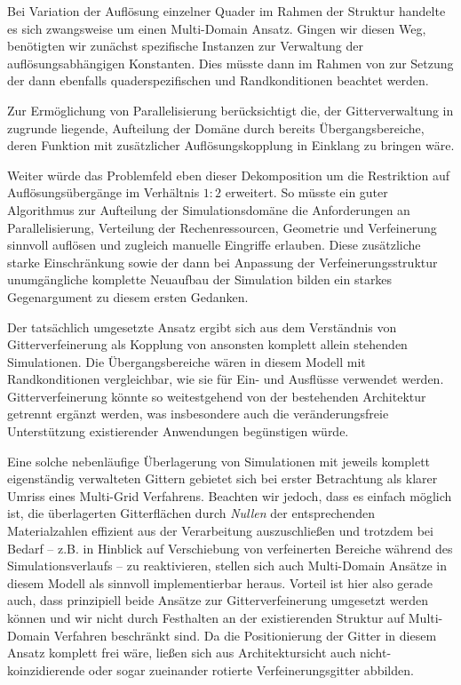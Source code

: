 Bei Variation der Auflösung einzelner Quader im Rahmen der  Struktur handelte es sich zwangsweise um einen Multi-Domain Ansatz. Gingen wir diesen Weg, benötigten wir zunächst  spezifische  Instanzen zur Verwaltung der auflösungsabhängigen Konstanten. Dies müsste dann im Rahmen von  zur Setzung der dann ebenfalls quaderspezifischen  und Randkonditionen beachtet werden.

Zur Ermöglichung von Parallelisierung berücksichtigt die, der Gitterverwaltung in  zugrunde liegende, Aufteilung der Domäne durch  bereits Übergangsbereiche, deren Funktion mit zusätzlicher Auflösungskopplung in Einklang zu bringen wäre.

Weiter würde das Problemfeld eben dieser Dekomposition um die Restriktion auf Auflösungsübergänge im Verhältnis \(1:2\) erweitert. So müsste ein guter Algorithmus zur Aufteilung der Simulationsdomäne die Anforderungen an Parallelisierung, Verteilung der Rechenressourcen, Geometrie und Verfeinerung sinnvoll auflösen und zugleich manuelle Eingriffe erlauben. Diese zusätzliche starke Einschränkung sowie der dann bei Anpassung der Verfeinerungsstruktur unumgängliche komplette Neuaufbau der Simulation bilden ein starkes Gegenargument zu diesem ersten Gedanken.

\bigskip
Der tatsächlich umgesetzte Ansatz ergibt sich aus dem Verständnis von Gitterverfeinerung als Kopplung von ansonsten komplett allein stehenden Simulationen. Die Übergangsbereiche wären in diesem Modell mit Randkonditionen vergleichbar, wie sie für Ein- und Ausflüsse verwendet werden. Gitterverfeinerung könnte so weitestgehend von der bestehenden Architektur getrennt ergänzt werden, was insbesondere auch die veränderungsfreie Unterstützung existierender Anwendungen begünstigen würde.

Eine solche nebenläufige Überlagerung von Simulationen mit jeweils komplett eigenständig verwalteten Gittern gebietet sich bei erster Betrachtung als klarer Umriss eines Multi-Grid Verfahrens. Beachten wir jedoch, dass es einfach möglich ist, die überlagerten Gitterflächen durch \emph{Nullen} der entsprechenden Materialzahlen effizient aus der Verarbeitung auszuschließen und trotzdem bei Bedarf -- z.B. in Hinblick auf Verschiebung von verfeinerten Bereiche während des Simulationsverlaufs -- zu reaktivieren, stellen sich auch Multi-Domain Ansätze in diesem Modell als sinnvoll implementierbar heraus. Vorteil ist hier also gerade auch, dass prinzipiell beide Ansätze zur Gitterverfeinerung umgesetzt werden können und wir nicht durch Festhalten an der existierenden Struktur auf Multi-Domain Verfahren beschränkt sind. Da die Positionierung der Gitter in diesem Ansatz komplett frei wäre, ließen sich aus Architektursicht auch nicht-koinzidierende oder sogar zueinander rotierte Verfeinerungsgitter abbilden.

